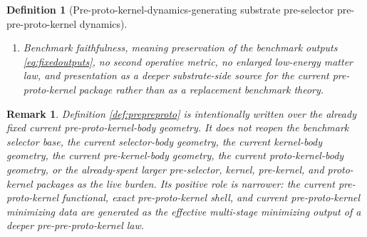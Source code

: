 \documentclass[11pt]{article}
\newcommand{\YoctoSelectorBody}[1]{\mathcal B_{#1}^{\mathrm{yoc,sel}}}
\newcommand{\YoctoSelectorShell}[1]{\mathcal Z_{#1}^{\mathrm{yoc,sel}}}
\newcommand{\PreSectionSelectorProj}[1]{\Pi_{#1}^{\mathrm{presel,sel}}}
\newcommand{\KernelProj}[1]{\Lambda_{#1}^{\mathrm{presel,ker}}}
\newcommand{\PreKernelProj}[1]{\Upsilon_{#1}^{\mathrm{presel,preker}}}
\newcommand{\ProtoKernelProj}[1]{\Omega_{#1}^{\mathrm{presel,proker}}}
\newcommand{\PreProtoKernelProj}[1]{\Xi_{#1}^{\mathrm{presel,preproker}}}
\newcommand{\PrePreProtoKernelBody}[1]{\mathcal L_{#1}^{\mathrm{presel,prepreproker}}}
\newcommand{\PrePreProtoKernelProj}[1]{\Theta_{#1}^{\mathrm{presel,prepreproker}}}
\newcommand{\PrePreProtoKernelFunctional}[1]{\mathscr W_{#1}^{\mathrm{presel,prepreproker}}}
\newcommand{\PrePreProtoKernelFullFiber}[2]{\mathcal Z_{#1}^{\mathrm{presel,prepreproker,full}}(#2)}
\newcommand{\PrePreProtoKernelFullMin}[1]{\mathfrak j_{#1}^{\mathrm{presel,prepreproker}}}
\newcommand{\PrePreProtoKernelShell}[1]{\mathcal K_{#1}^{\mathrm{presel,prepreproker}}}
\newcommand{\InducedPreProtoKernelShell}[1]{\widetilde{\mathcal O}_{#1}^{\mathrm{presel,preproker}}}
\newtheorem{definition}{Definition}
\newtheorem{remark}{Remark}
\begin{document}
\begin{definition}[Pre-proto-kernel-dynamics-generating substrate pre-selector pre-pre-proto-kernel dynamics]
\begin{enumerate}
\[    \PreSectionSelectorProj{\sigma}\bigl(\KernelProj{\sigma}(\PreKernelProj{\sigma}(\ProtoKernelProj{\sigma}(\PreProtoKernelProj{\sigma}(\PrePreProtoKernelProj{\sigma}(s))))))\bigr)=y
    \right\}.
    \]
    The restriction of \(\PrePreProtoKernelFunctional{\sigma}\) to that fiber is required to attain a unique minimizer depending smoothly on \(y\); write
    \[
    \PrePreProtoKernelFullMin{\sigma}:\YoctoSelectorBody{\sigma}\to\PrePreProtoKernelBody{\sigma}.
    \]
    The exact pre-pre-proto-kernel shell
    \[
    \PrePreProtoKernelShell{\sigma}
    \equiv
    \left\{
    s\in\PrePreProtoKernelBody{\sigma}:
    \PreSectionSelectorProj{\sigma}\bigl(\KernelProj{\sigma}(\PreKernelProj{\sigma}(\ProtoKernelProj{\sigma}(\PreProtoKernelProj{\sigma}(\PrePreProtoKernelProj{\sigma}(s))))))\bigr)\in\YoctoSelectorShell{\sigma},
    \;
    \PrePreProtoKernelFunctional{\sigma}(s)
    =
    \min_{t\in\PrePreProtoKernelFullFiber{\sigma}{\PreSectionSelectorProj{\sigma}(\KernelProj{\sigma}(\PreKernelProj{\sigma}(\ProtoKernelProj{\sigma}(\PreProtoKernelProj{\sigma}(\PrePreProtoKernelProj{\sigma}(s))))))}}
    \PrePreProtoKernelFunctional{\sigma}(t)
    \right\}
    \]
    is required to be a closed embedded submanifold, and
    \[
    \PrePreProtoKernelProj{\sigma}\big|_{\PrePreProtoKernelShell{\sigma}}
    :
    \PrePreProtoKernelShell{\sigma}\xrightarrow{\cong}\InducedPreProtoKernelShell{\sigma}
    \]
    is required to be a diffeomorphism.
    \item Benchmark faithfulness, meaning preservation of the benchmark outputs \eqref{eq:fixedoutputs}, no second operative metric, no enlarged low-energy matter law, and presentation as a deeper substrate-side source for the current pre-proto-kernel package rather than as a replacement benchmark theory.
\end{enumerate}
\end{definition}

\begin{remark}
Definition \ref{def:prepreproto} is intentionally written over the already fixed current pre-proto-kernel-body geometry. It does not reopen the benchmark selector base, the current selector-body geometry, the current kernel-body geometry, the current pre-kernel-body geometry, the current proto-kernel-body geometry, or the already-spent larger pre-selector, kernel, pre-kernel, and proto-kernel packages as the live burden. Its positive role is narrower: the current pre-proto-kernel functional, exact pre-proto-kernel shell, and current pre-proto-kernel minimizing data are generated as the effective multi-stage minimizing output of a deeper pre-pre-proto-kernel law.
\end{remark}
\end{document}
